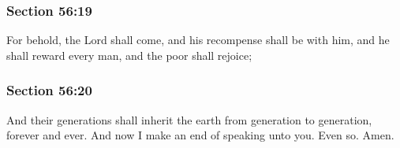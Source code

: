 
	\subsubsection{Section 56:19} %
		\label{DC56-19}

		For behold, the Lord shall come, and his recompense shall be with him, and he shall reward every man, and the poor shall rejoice;


	\subsubsection{Section 56:20} %
		\label{DC56-20}

		And their generations shall inherit the earth from generation to generation, forever and ever. And now I make an end of speaking unto you. Even so. Amen.

